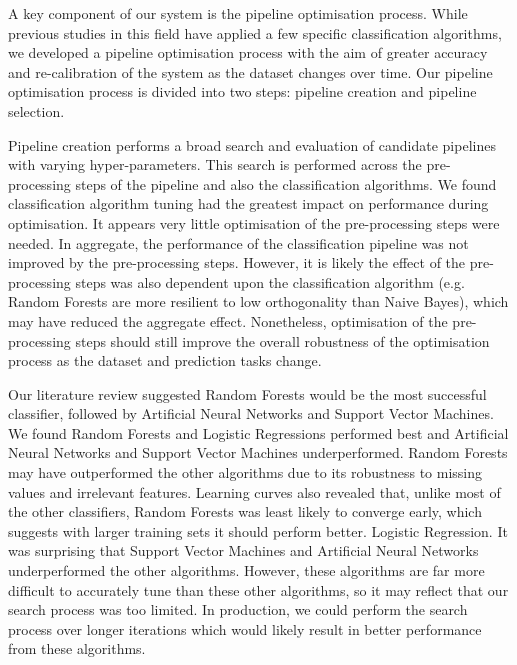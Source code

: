 \documentclass[../thesis/thesis.tex]{subfiles}
\begin{document}
A key component of our system is the pipeline optimisation process. While previous studies in this field have applied a few specific classification algorithms, we developed a pipeline optimisation process with the aim of greater accuracy and re-calibration of the system as the dataset changes over time. Our pipeline optimisation process is divided into two steps: pipeline creation and pipeline selection.

Pipeline creation performs a broad search and evaluation of candidate pipelines with varying hyper-parameters. This search is performed across the pre-processing steps of the pipeline and also the classification algorithms. We found classification algorithm tuning had the greatest impact on performance during optimisation. It appears very little optimisation of the pre-processing steps were needed. In aggregate, the performance of the classification pipeline was not improved by the pre-processing steps. However, it is likely the effect of the pre-processing steps was also dependent upon the classification algorithm (e.g. Random Forests are more resilient to low orthogonality than Naive Bayes), which may have reduced the aggregate effect. Nonetheless, optimisation of the pre-processing steps should still improve the overall robustness of the optimisation process as the dataset and prediction tasks change.

Our literature review suggested Random Forests would be the most successful classifier, followed by Artificial Neural Networks and Support Vector Machines. We found Random Forests and Logistic Regressions performed best and Artificial Neural Networks and Support Vector Machines underperformed. Random Forests may have outperformed the other algorithms due to its robustness to missing values and irrelevant features. Learning curves also revealed that, unlike most of the other classifiers, Random Forests was least likely to converge early, which suggests with larger training sets it should perform better. Logistic Regression. It was surprising that Support Vector Machines and Artificial Neural Networks underperformed the other algorithms. However, these algorithms are far more difficult to accurately tune than these other algorithms, so it may reflect that our search process was too limited. In production, we could perform the search process over longer iterations which would likely result in better performance from these algorithms.
\end{document}

